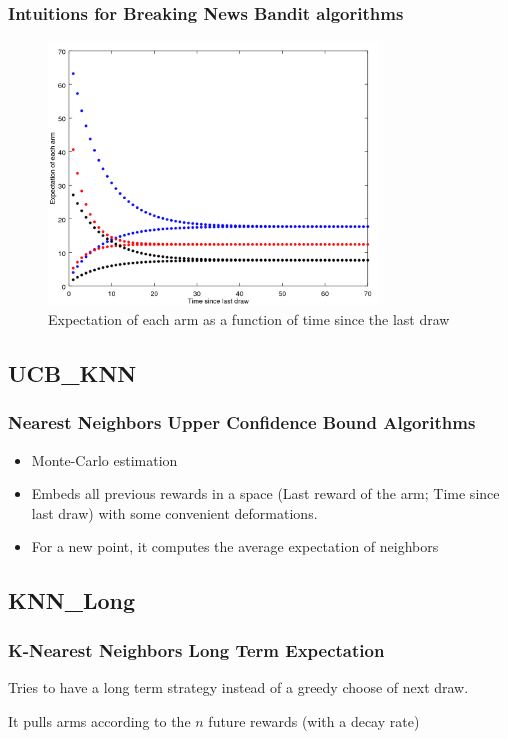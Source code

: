\documentclass[french]{beamer}
\begin{document}
\begin{frame}
	\frametitle{Intuitions for Breaking News Bandit algorithms}
	\begin{figure}[h]
		\begin{center}
			\includegraphics[width=0.78\textwidth]{expectations.png}
		\end{center}
		\caption{Expectation of each arm as a function of time since the last draw}
	\end{figure}

\end{frame}

\subsection{UCB\_KNN}
\begin{frame}
	\frametitle{Nearest Neighbors Upper Confidence Bound Algorithms}


	\begin{itemize}
		\item Monte-Carlo estimation
		\item Embeds all previous rewards in a space (Last reward of the arm; Time since last draw) with some convenient deformations.
		\item For a new point, it computes the average expectation of neighbors
	\end{itemize}

\end{frame}

\subsection{KNN\_Long}
\begin{frame}
	\frametitle{K-Nearest Neighbors Long Term Expectation}


	Tries to have a long term strategy instead of a greedy choose of next draw.
	\newline

	It pulls arms according to the $n$ future rewards (with a decay rate)

\end{frame}
\end{document}
